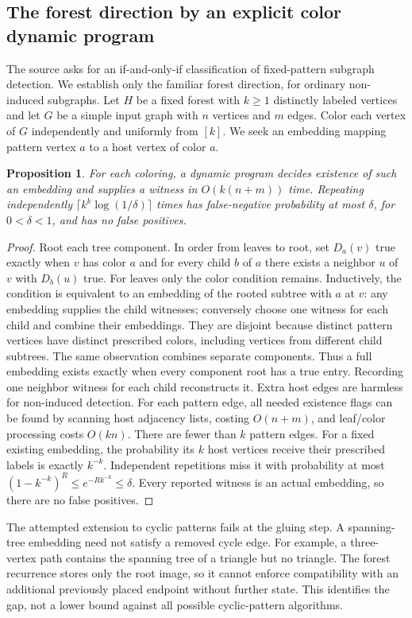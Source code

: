 \documentclass[11pt]{article}
\newtheorem{proposition}{Proposition}
\begin{document}
\subsection{The forest direction by an explicit color dynamic program}
The source asks for an if-and-only-if classification of fixed-pattern subgraph detection. We establish only the familiar forest direction, for ordinary non-induced subgraphs. Let $H$ be a fixed forest with $k\ge1$ distinctly labeled vertices and let $G$ be a simple input graph with $n$ vertices and $m$ edges. Color each vertex of $G$ independently and uniformly from $[k]$. We seek an embedding mapping pattern vertex $a$ to a host vertex of color $a$.
\begin{proposition}
For each coloring, a dynamic program decides existence of such an embedding and supplies a witness in $O(k(n+m))$ time. Repeating independently $\lceil k^k\log(1/\delta)\rceil$ times has false-negative probability at most $\delta$, for $0<\delta<1$, and has no false positives.
\end{proposition}
\begin{proof}
Root each tree component. In order from leaves to root, set $D_a(v)$ true exactly when $v$ has color $a$ and for every child $b$ of $a$ there exists a neighbor $u$ of $v$ with $D_b(u)$ true. For leaves only the color condition remains. Inductively, the condition is equivalent to an embedding of the rooted subtree with $a$ at $v$: any embedding supplies the child witnesses; conversely choose one witness for each child and combine their embeddings. They are disjoint because distinct pattern vertices have distinct prescribed colors, including vertices from different child subtrees. The same observation combines separate components. Thus a full embedding exists exactly when every component root has a true entry. Recording one neighbor witness for each child reconstructs it. Extra host edges are harmless for non-induced detection.
For each pattern edge, all needed existence flags can be found by scanning host adjacency lists, costing $O(n+m)$, and leaf/color processing costs $O(kn)$. There are fewer than $k$ pattern edges. For a fixed existing embedding, the probability its $k$ host vertices receive their prescribed labels is exactly $k^{-k}$. Independent repetitions miss it with probability at most $(1-k^{-k})^R\le e^{-Rk^{-k}}\le\delta$. Every reported witness is an actual embedding, so there are no false positives.
\end{proof}
The attempted extension to cyclic patterns fails at the gluing step. A spanning-tree embedding need not satisfy a removed cycle edge. For example, a three-vertex path contains the spanning tree of a triangle but no triangle. The forest recurrence stores only the root image, so it cannot enforce compatibility with an additional previously placed endpoint without further state. This identifies the gap, not a lower bound against all possible cyclic-pattern algorithms.
\end{document}
